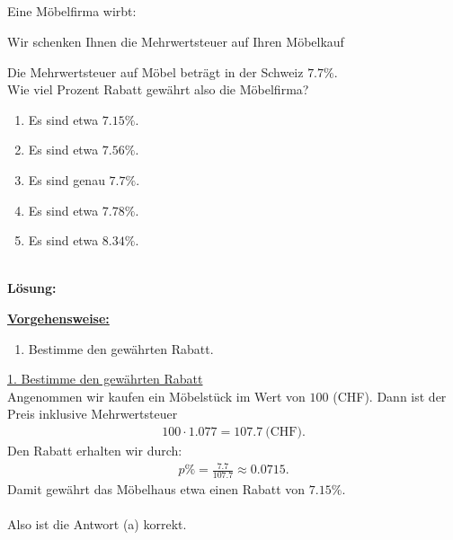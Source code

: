 \subsection*{}
Eine Möbelfirma wirbt:
\begin{center}
	\glqq Wir schenken Ihnen die Mehrwertsteuer auf Ihren Möbelkauf\grqq
\end{center}
Die Mehrwertsteuer auf Möbel beträgt in der Schweiz $ 7.7 \% $.\\
Wie viel Prozent Rabatt gewährt also die Möbelfirma?
\renewcommand{\labelenumi}{(\alph{enumi})}
\begin{enumerate}
	\item 
	Es sind etwa $ 7.15 \% $.
	\item 
	Es sind etwa $ 7.56 \% $.
	\item 
	Es sind genau $ 7.7 \% $.
	\item
	Es sind etwa $ 7.78 \% $.
	\item
	Es sind etwa $ 8.34 \% $.
\end{enumerate}
\ \\
\textbf{Lösung:}
\begin{mdframed}
\underline{\textbf{Vorgehensweise:}}
\renewcommand{\labelenumi}{\theenumi.}
\begin{enumerate}
\item Bestimme den gewährten Rabatt.
\end{enumerate}
\end{mdframed}

\underline{1. Bestimme den gewährten Rabatt}\\
Angenommen wir kaufen ein Möbelstück im Wert von $ 100 $ (CHF).
Dann ist der Preis inklusive Mehrwertsteuer
\begin{align*}
	100 \cdot 1.077 = 107.7 \ \textrm{(CHF)}.
\end{align*} 
Den Rabatt erhalten wir durch:
\begin{align*}
	p \% = \frac{7.7}{107.7} 
	\approx 
	0.0715.
\end{align*}
Damit gewährt das Möbelhaus etwa einen Rabatt von $ 7.15 \% $.\\
\\
Also ist die Antwort (a) korrekt.



\newpage

